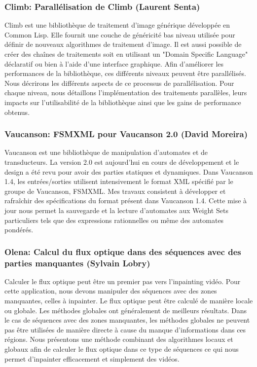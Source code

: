 \documentclass[a4paper,11pt,twoside,final]{article}
\begin{document}
  \subsubsection*{Climb: Parallélisation de Climb (Laurent Senta)}

  Climb est une bibliothèque de traitement d'image générique développée en
  Common Lisp. Elle fournit une couche de généricité bas niveau utilisée pour
  définir de nouveaux algorithmes de traitement d'image. Il est aussi possible
  de créer des chaînes de traitements soit en utilisant un "Domain Specific
  Language" déclaratif ou bien à l'aide d'une interface graphique. Afin
  d'améliorer les performances de la bibliothèque, ces différents niveaux
  peuvent être parallélisés. Nous décrirons les différents aspects de ce
  processus de parallélisation. Pour chaque niveau, nous détaillons
  l'implémentation des traitements parallèles, leurs impacts sur
  l'utilisabilité de la bibliothèque ainsi que les gains de performance
  obtenus.

  \subsubsection*{Vaucanson: FSMXML pour Vaucanson 2.0 (David Moreira)}

  Vaucanson est une bibliothèque de manipulation d'automates et de
  transducteurs. La version 2.0 est aujourd'hui en cours de développement et le
  design a été revu pour avoir des parties statiques et dynamiques. Dans
  Vaucanson 1.4, les entrées/sorties utilisent intensivement le format XML
  spécifié par le groupe de Vaucanson, FSMXML\@. Mes travaux consistent à
  développer et rafraîchir des spécifications du format présent dans Vaucanson
  1.4. Cette mise à jour nous permet la sauvegarde et la lecture d'automates
  aux Weight Sets particuliers tels que des expressions rationnelles ou même
  des automates pondérés.

  \subsubsection*{Olena: Calcul du flux optique dans des séquences avec des
  parties manquantes (Sylvain Lobry)}

  Calculer le flux optique peut être un premier pas vers l'inpainting vidéo.
  Pour cette application, nous devons manipuler des séquences avec des zones
  manquantes, celles à inpainter. Le flux optique peut être calculé de manière
  locale ou globale. Les méthodes globales ont généralement de meilleurs
  résultats. Dans le cas de séquences avec des zones manquantes, les méthodes
  globales ne peuvent pas être utilisées de manière directe à cause du manque
  d'informations dans ces régions. Nous présentons une méthode combinant des
  algorithmes locaux et globaux afin de calculer le flux optique dans ce type
  de séquences ce qui nous permet d'inpainter efficacement et simplement des
  vidéos.
\end{document}
